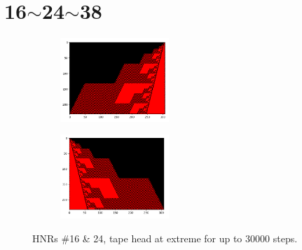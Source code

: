 \documentclass[12pt]{article}
\begin{document}
\newpage

\section*{16$\sim$24$\sim$38}

\begin{figure}[H]
\centering
\begin{subfigure}
\centering
\includegraphics[width=0.45\textwidth]{16.png}
\label{fig:16}
\end{subfigure}
\hfill
\begin{subfigure}
\centering
\includegraphics[width=0.45\textwidth]{24.png}
\label{fig:24}
\end{subfigure}
\caption{HNRs \#16 \& 24, tape head at extreme for up to 30000 steps.}
\end{figure}
\end{document}
